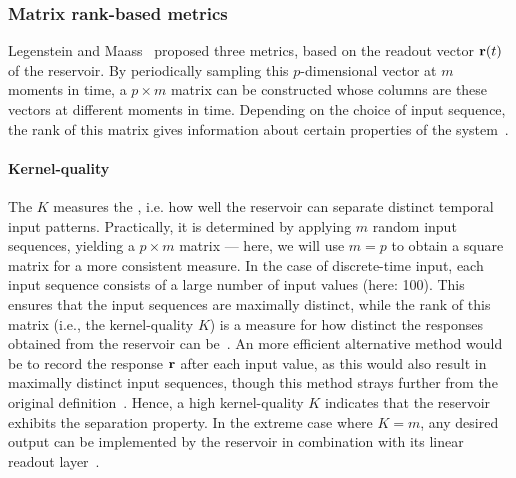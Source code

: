\subsubsection{Matrix rank-based metrics} \label{sec:1:RC_metrics_KQ}
Legenstein and Maass~\cite{WhatMakesPowerful} proposed three metrics, based on the readout vector $\boldsymbol{\mathbf{r}}(t)$ of the reservoir.
By periodically sampling this $p$-dimensional vector at $m$ moments in time, a $p \times m$ matrix can be constructed whose columns are these vectors at different moments in time.
Depending on the choice of input sequence, the rank of this matrix gives information about certain properties of the system~\cite{RC_ASI}.

\paragraph{Kernel-quality}
The  $K$ measures the , i.e. how well the reservoir can separate distinct temporal input patterns.
Practically, it is determined by applying $m$ random input sequences, yielding a $p \times m$ matrix --- here, we will use $m=p$ to obtain a square matrix for a more consistent measure.
In the case of discrete-time input, each input sequence consists of a large number of input values (here: 100).
This ensures that the input sequences are maximally distinct, while the rank of this matrix (i.e., the kernel-quality $K$) is a measure for how distinct the responses obtained from the reservoir can be~\cite{Vidamour_2022}.
An more efficient alternative method would be to record the response $\boldsymbol{\mathbf{r}}$ after each input value, as this would also result in maximally distinct input sequences, though this method strays further from the original definition~\cite{RC_HierarchicalNeuroevolution,RCbenchmarksReview1}.
Hence, a high kernel-quality $K$ indicates that the reservoir exhibits the separation property.
In the extreme case where $K=m$, any desired output can be implemented by the reservoir in combination with its linear readout layer~\cite{WhatMakesPowerful}.


